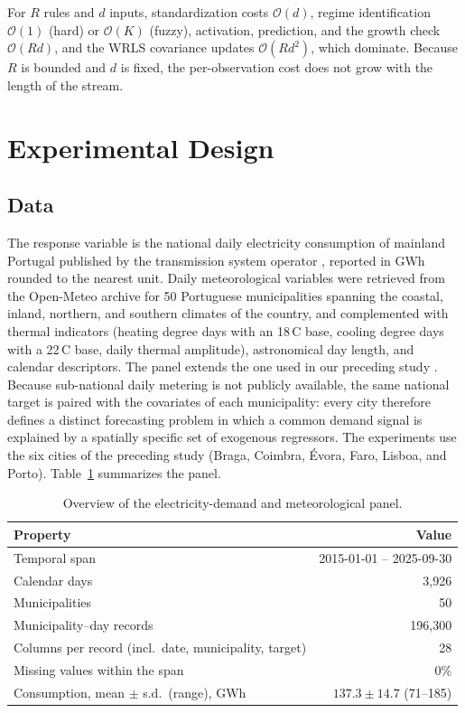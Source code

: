 \documentclass[preprint,12pt]{elsarticle}
\begin{document}
\label{subsec:complexity}
For $R$ rules and $d$ inputs, standardization costs $\mathcal{O}(d)$, regime identification $\mathcal{O}(1)$ (hard) or $\mathcal{O}(K)$ (fuzzy), activation, prediction, and the growth check $\mathcal{O}(Rd)$, and the WRLS covariance updates $\mathcal{O}(Rd^2)$, which dominate. Because $R$ is bounded and $d$ is fixed, the per-observation cost does not grow with the length of the stream.

\section{Experimental Design}
\label{sec:experimental_design}

\subsection{Data}
\label{subsec:data_description}

The response variable is the national daily electricity consumption of mainland Portugal published by the transmission system operator \citep{ren2026daily}, reported in GWh rounded to the nearest unit. Daily meteorological variables were retrieved from the Open-Meteo archive \citep{openmeteo2023} for 50 Portuguese municipalities spanning the coastal, inland, northern, and southern climates of the country, and complemented with thermal indicators (heating degree days with an 18\,\textdegree C base, cooling degree days with a 22\,\textdegree C base, daily thermal amplitude), astronomical day length, and calendar descriptors. The panel extends the one used in our preceding study \citep{catarro2026hybrid}. Because sub-national daily metering is not publicly available, the same national target is paired with the covariates of each municipality: every city therefore defines a distinct forecasting problem in which a common demand signal is explained by a spatially specific set of exogenous regressors. The experiments use the six cities of the preceding study (Braga, Coimbra, \'Evora, Faro, Lisboa, and Porto). Table~\ref{tab:dataset_overview} summarizes the panel.

\begin{table}[!t]
\caption{Overview of the electricity-demand and meteorological panel.}
\label{tab:dataset_overview}
\centering
\small
\begin{tabular}{lr}
\toprule
\textbf{Property} & \textbf{Value} \\
\midrule
Temporal span & 2015-01-01 -- 2025-09-30 \\
Calendar days & 3{,}926 \\
Municipalities & 50 \\
Municipality--day records & 196{,}300 \\
Columns per record (incl.\ date, municipality, target) & 28 \\
Missing values within the span & 0\% \\
Consumption, mean $\pm$ s.d.\ (range), GWh & $137.3 \pm 14.7$ (71--185) \\
\bottomrule
\end{tabular}
\end{table}
\end{document}
